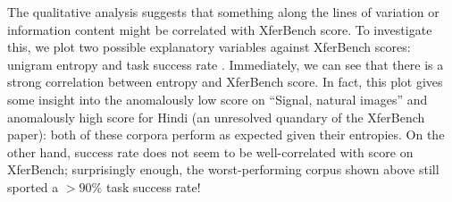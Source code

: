 The qualitative analysis suggests that something along the lines of variation or information content might be correlated with XferBench score.
To investigate this, we plot two possible explanatory variables against XferBench scores: unigram entropy and task success rate .
Immediately, we can see that there is a strong correlation between entropy and XferBench score.
In fact, this plot gives some insight into the anomalously low score on ``Signal, natural images'' \citep{yao2022linking} and anomalously high score for Hindi (an unresolved quandary of the XferBench paper): both of these corpora perform as expected given their entropies.
On the other hand, success rate does not seem to be well-correlated with score on XferBench; surprisingly enough, the worst-performing corpus shown above still sported a ${>}90\%$ task success rate!


